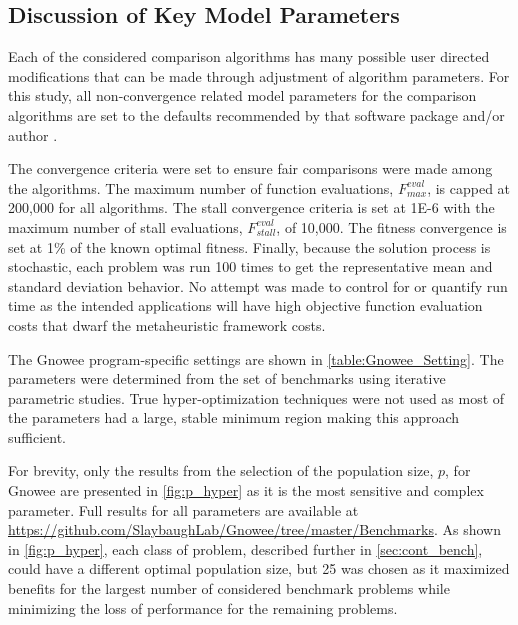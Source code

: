 \documentclass{article}                                                                           %
\begin{document}
\subsection{Discussion of Key Model Parameters} \label{sec:model_params}
Each of the considered comparison algorithms has many possible user directed modifications that can be made through adjustment of algorithm parameters.
For this study, all non-convergence related model parameters for the comparison algorithms are set to the defaults recommended by that software package and/or author \cite{Yang2009, Egea2014, Zhou2014, Walton2011, Mathworks2015}.

The convergence criteria were set to ensure fair comparisons were made among the algorithms.
The maximum number of function evaluations, $F^{eval}_{max}$, is capped at 200,000 for all algorithms.
The stall convergence criteria is set at 1E-6 with the maximum number of stall evaluations, $F^{eval}_{stall}$, of 10,000.  
The fitness convergence is set at 1\% of the known optimal fitness.  
Finally, because the solution process is stochastic, each problem was run 100 times to get the representative mean and standard deviation behavior. 
No attempt was made to control for or quantify run time as the intended applications will have high objective function evaluation costs that dwarf the metaheuristic framework costs. 

The Gnowee program-specific settings are shown in \autoref{table:Gnowee_Setting}.
The parameters were determined from the set of benchmarks using iterative parametric studies.
True hyper-optimization techniques were not used as most of the parameters had a large, stable minimum region making this approach sufficient.  

For brevity, only the results from the selection of the population size, $p$, for Gnowee are presented in \autoref{fig:p_hyper} as it is the most sensitive and complex parameter. Full results for all parameters are available at \url{https://github.com/SlaybaughLab/Gnowee/tree/master/Benchmarks}. 
As shown in \autoref{fig:p_hyper}, each class of problem, described further in \autoref{sec:cont_bench}, could have a different optimal population size, but 25 was chosen as it maximized benefits for the largest number of considered benchmark problems while minimizing the loss of performance for the remaining problems.  
\end{document}
